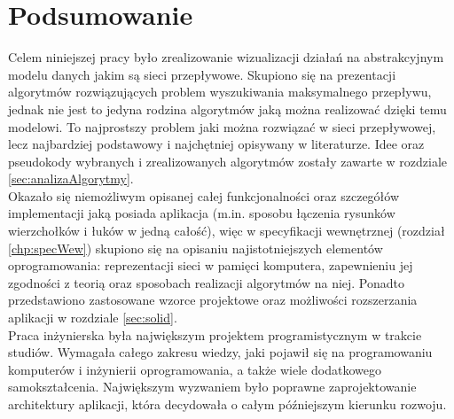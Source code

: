 \chapter{Podsumowanie}
Celem niniejszej pracy było zrealizowanie wizualizacji działań na abstrakcyjnym modelu danych jakim są sieci przepływowe. Skupiono się na prezentacji algorytmów rozwiązujących problem wyszukiwania maksymalnego przepływu, jednak nie jest to jedyna rodzina algorytmów jaką można realizować dzięki temu modelowi. To najprostszy problem jaki można rozwiązać w sieci przepływowej, lecz najbardziej podstawowy i najchętniej opisywany w literaturze. Idee oraz pseudokody wybranych i zrealizowanych algorytmów zostały zawarte w rozdziale \ref{sec:analizaAlgorytmy}.\\\indent
Okazało się niemożliwym opisanej całej funkcjonalności oraz szczegółów implementacji jaką posiada aplikacja (m.in. sposobu łączenia rysunków wierzchołków i łuków w jedną całość), więc w specyfikacji wewnętrznej (rozdział \ref{chp:specWew}) skupiono się na opisaniu najistotniejszych elementów oprogramowania: reprezentacji sieci w pamięci komputera, zapewnieniu jej zgodności z teorią oraz sposobach realizacji algorytmów na niej. Ponadto przedstawiono zastosowane wzorce projektowe oraz możliwości rozszerzania aplikacji w rozdziale \ref{sec:solid}.\\\indent
Praca inżynierska była największym projektem programistycznym w trakcie studiów. Wymagała całego zakresu wiedzy, jaki pojawił się na programowaniu komputerów i inżynierii oprogramowania, a także wiele dodatkowego samokształcenia. Największym wyzwaniem było poprawne zaprojektowanie architektury aplikacji, która decydowała o całym późniejszym kierunku rozwoju.